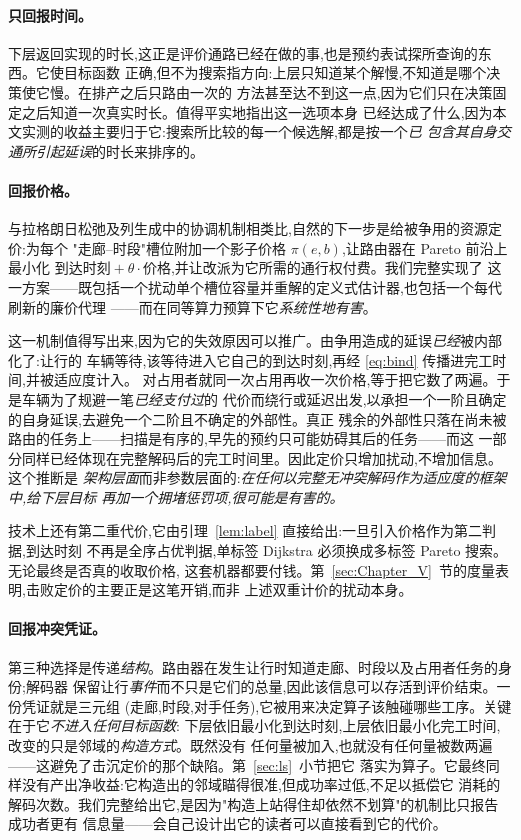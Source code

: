 \documentclass[manuscript,screen,review]{acmart}
\begin{document}
\paragraph{只回报时间。}
下层返回实现的时长,这正是评价通路已经在做的事,也是预约表试探所查询的东西。它使目标函数
正确,但不为搜索指方向:上层只知道某个解慢,不知道是哪个决策使它慢。在排产之后只路由一次的
方法甚至达不到这一点,因为它们只在决策固定之后知道一次真实时长。值得平实地指出这一选项本身
已经达成了什么,因为本文实测的收益主要归于它:搜索所比较的每一个候选解,都是按一个\emph{已
包含其自身交通所引起延误}的时长来排序的。

\paragraph{回报价格。}
与拉格朗日松弛及列生成中的协调机制相类比,自然的下一步是给被争用的资源定价:为每个
"走廊--时段"槽位附加一个影子价格 $\pi(e,b)$,让路由器在 Pareto 前沿上最小化
$\text{到达时刻}+\theta\cdot\text{价格}$,并让改派为它所需的通行权付费。我们完整实现了
这一方案——既包括一个扰动单个槽位容量并重解的定义式估计器,也包括一个每代刷新的廉价代理
——而在同等算力预算下它\emph{系统性地有害}。

这一机制值得写出来,因为它的失效原因可以推广。由争用造成的延误\emph{已经}被内部化了:让行的
车辆等待,该等待进入它自己的到达时刻,再经 \eqref{eq:bind} 传播进完工时间,并被适应度计入。
对占用者就同一次占用再收一次价格,等于把它数了两遍。于是车辆为了规避一笔\emph{已经支付过}的
代价而绕行或延迟出发,以承担一个一阶且确定的自身延误,去避免一个二阶且不确定的外部性。真正
残余的外部性只落在尚未被路由的任务上——扫描是有序的,早先的预约只可能妨碍其后的任务——而这
一部分同样已经体现在完整解码后的完工时间里。因此定价只增加扰动,不增加信息。这个推断是
\emph{架构层面}而非参数层面的:\emph{在任何以完整无冲突解码作为适应度的框架中,给下层目标
再加一个拥堵惩罚项,很可能是有害的。}

技术上还有第二重代价,它由引理~\ref{lem:label} 直接给出:一旦引入价格作为第二判据,到达时刻
不再是全序占优判据,单标签 Dijkstra 必须换成多标签 Pareto 搜索。无论最终是否真的收取价格,
这套机器都要付钱。第~\ref{sec:Chapter_V}~节的度量表明,击败定价的主要正是这笔开销,而非
上述双重计价的扰动本身。

\paragraph{回报冲突凭证。}
第三种选择是传递\emph{结构}。路由器在发生让行时知道走廊、时段以及占用者任务的身份;解码器
保留让行\emph{事件}而不只是它们的总量,因此该信息可以存活到评价结束。一份凭证就是三元组
(走廊,时段,对手任务),它被用来决定算子该触碰哪些工序。关键在于它\emph{不进入任何目标函数}:
下层依旧最小化到达时刻,上层依旧最小化完工时间,改变的只是邻域的\emph{构造方式}。既然没有
任何量被加入,也就没有任何量被数两遍——这避免了击沉定价的那个缺陷。第~\ref{sec:ls}~小节把它
落实为算子。它最终同样没有产出净收益:它构造出的邻域瞄得很准,但成功率过低,不足以抵偿它
消耗的解码次数。我们完整给出它,是因为"构造上站得住却依然不划算"的机制比只报告成功者更有
信息量——会自己设计出它的读者可以直接看到它的代价。
\end{document}
